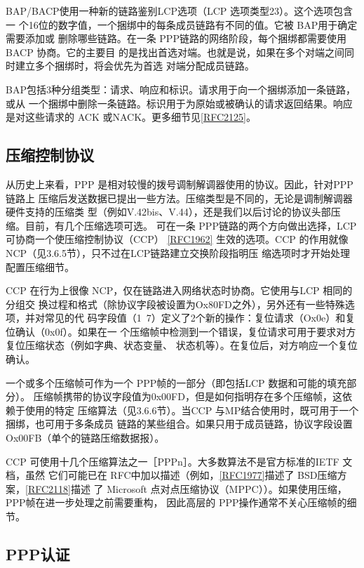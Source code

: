 BAP/BACP使用一种新的链路鉴别LCP选项（LCP 选项类型23）。这个选项包含一
个16位的数字值，一个捆绑中的每条成员链路有不同的值。它被 BAP用于确定需要添加或
删除哪些链路。在一条 PPP链路的网络阶段，每个捆绑都需要使用BACP 协商。它的主要目
的是找出首选对端。也就是说，如果在多个对端之间同时建立多个捆绑时，将会优先为首选
对端分配成员链路。

BAP包括3种分组类型：请求、响应和标识。请求用于向一个捆绑添加一条链路，或从
一个捆绑中删除一条链路。标识用于为原始或被确认的请求返回结果。响应是对这些请求的
ACK 或NACK。更多细节见\href{https://www.rfc-editor.org/rfc/rfc2125}{[RFC2125]}。

\subsection{压缩控制协议}

从历史上来看，PPP 是相对较慢的拨号调制解调器使用的协议。因此，针对PPP链路上
压缩后发送数据已提出一些方法。压缩类型是不同的，无论是调制解调器硬件支持的压缩类
型（例如V.42bis、V.44），还是我们以后讨论的协议头部压缩。目前，有几个压缩选项可选。
可在一条 PPP链路的两个方向做出选择，LCP 可协商一个使压缩控制协议（CCP） \href{https://www.rfc-editor.org/rfc/rfc1962}{[RFC1962]}
生效的选项。CCP 的作用就像 NCP（见3.6.5节），只不过在LCP链路建立交换阶段指明压
缩选项时才开始处理配置压缩细节。

CCP 在行为上很像 NCP，仅在链路进入网络状态时协商。它使用与LCP 相同的分组交
换过程和格式（除协议字段被设置为Ox80FD之外），另外还有一些特殊选项，并对常见的代
码字段值（1~7）定义了2个新的操作：复位请求（Ox0e）和复位确认（0x0f）。如果在一
个压缩帧中检测到一个错误，复位请求可用于要求对方复位压缩状态（例如字典、状态变量、
状态机等）。在复位后，对方响应一个复位确认。

一个或多个压缩帧可作为一个 PPP帧的一部分（即包括LCP 数据和可能的填充部分）。
压缩帧携带的协议字段值为0x00FD，但是如何指明存在多个压缩帧，这依赖于使用的特定
压缩算法（见3.6.6节）。当CCP 与MP结合使用时，既可用于一个捆绑，也可用于多条成员
链路的某些组合。如果只用于成员链路，协议字段设置 Ox00FB（单个的链路压缩数据报）。

CCP 可使用十几个压缩算法之一［PPPn］。大多数算法不是官方标准的IETF 文档，虽然
它们可能已在 RFC中加以描述（例如，\href{https://www.rfc-editor.org/rfc/rfc1977}{[RFC1977]}描述了 BSD压缩方案，\href{https://www.rfc-editor.org/rfc/rfc2118}{[RFC2118]}描述
了 Microsoft 点对点压缩协议（MPPC））。如果使用压缩，PPP帧在进一步处理之前需要重构，
因此高层的 PPP操作通常不关心压缩帧的细节。

\subsection{PPP认证}

